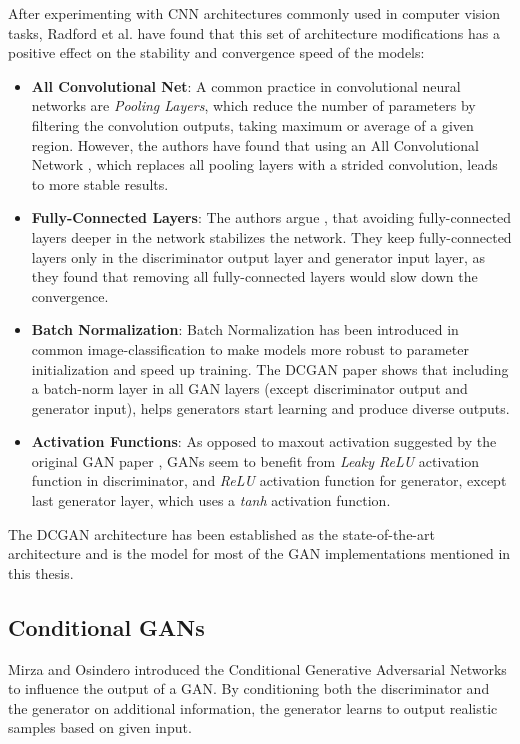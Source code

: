 \documentclass[12pt]{report}
\begin{document}
After experimenting with CNN architectures commonly used in computer vision tasks, Radford et al. \cite{radford_unsupervised_2015} have found that this set of architecture modifications has a positive effect on the stability and convergence speed of the models:
\begin{itemize}
\item \textbf{All Convolutional Net}: A common practice in convolutional neural networks are \textit{Pooling Layers}, which reduce the number of parameters by filtering the convolution outputs, taking maximum or average of a given region. However, the authors have found that using an All Convolutional Network \cite{springenberg_striving_2014}, which replaces all pooling layers with a strided convolution, leads to more stable results.
\item \textbf{Fully-Connected Layers}: The authors argue \cite{radford_unsupervised_2015}, that avoiding fully-connected layers deeper in the network stabilizes the network. They keep fully-connected layers only in the discriminator output layer and generator input layer, as they found that removing all fully-connected layers would slow down the convergence.
\item \textbf{Batch Normalization}: Batch Normalization \cite{ioffe_batch_2015} has been introduced in common image-classification to make models more robust to parameter initialization and speed up training. The DCGAN paper shows that including a batch-norm layer in all GAN layers (except discriminator output and generator input), helps generators start learning and produce diverse outputs.
\item \textbf{Activation Functions}: As opposed to maxout activation suggested by the original GAN paper \cite{goodfellow_generative_2014}, GANs seem to benefit from \textit{Leaky ReLU} activation function in discriminator, and \textit{ReLU} activation function for generator, except last generator layer, which uses a \textit{tanh} activation function.
\end{itemize}

The DCGAN architecture has been established as the state-of-the-art architecture and is the model for most of the GAN implementations mentioned in this thesis.

\subsection{Conditional GANs} \label{sec:cond_gan}
Mirza and Osindero \cite{mirza_conditional_2014} introduced the Conditional Generative Adversarial Networks to influence the output of a GAN. By conditioning both the discriminator and the generator on additional information, the generator learns to output realistic samples based on given input.
\end{document}
